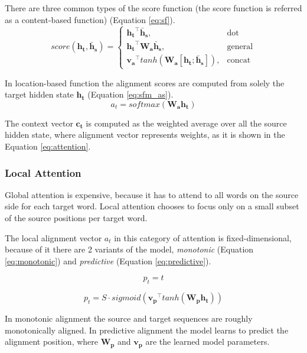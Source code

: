 There are three common types of the score function (the score function is referred as a content-based function) (Equation \ref{eq:sf}).
\begin{equation}\label{eq:sf}
score(\mathbf{h_t}, \mathbf{\bar{h}_s}) = \begin{cases} \mathbf{h_t}^\intercal \mathbf{\bar{h}_s}, & \mbox{dot} \\ \mathbf{h_t}^\intercal \mathbf{W_a} \mathbf{\bar{h}_s}, & \mbox{general} \\ \mathbf{v_a}^\intercal tanh(\mathbf{W_a} [\mathbf{h_t}; \mathbf{\bar{h}_s}]), & \mbox{concat} \end{cases}
\end{equation}

In location-based function the alignment scores are computed from solely the target hidden state $\mathbf{h_t}$ (Equation \ref{eq:sfm_as}).
\begin{equation} \label{eq:sfm_as}
a_t = softmax(\mathbf{W_a}\mathbf{h_t})
\end{equation}

The context vector $\mathbf{c_t}$ is computed as the weighted average over all the source hidden state, where alignment vector represents weights, as it is shown in the Equation \ref{eq:attention}.

\subsubsection{Local Attention}
Global attention is expensive, because it has to attend to all words on the source side for each target word. Local attention chooses to focus only on a small subset of the source positions per target word.

The local alignment vector $a_t$ in this category of attention is fixed-dimensional, because of it there are 2 variants of the model, \textit{monotonic} (Equation \ref{eq:monotonic}) and \textit{predictive} (Equation \ref{eq:predictive}).

\begin{equation} \label{eq:monotonic}
p_t = t
\end{equation}

\begin{equation} \label{eq:predictive}
p_t = S \cdot sigmoid(\mathbf{v_p}^\intercal tanh(\mathbf{W_p} \mathbf{h_t}))
\end{equation}

In monotonic alignment the source and target sequences are roughly monotonically aligned. In predictive alignment the model learns to predict the alignment position, where $\mathbf{W_p}$ and $\mathbf{v_p}$ are the learned model parameters.

